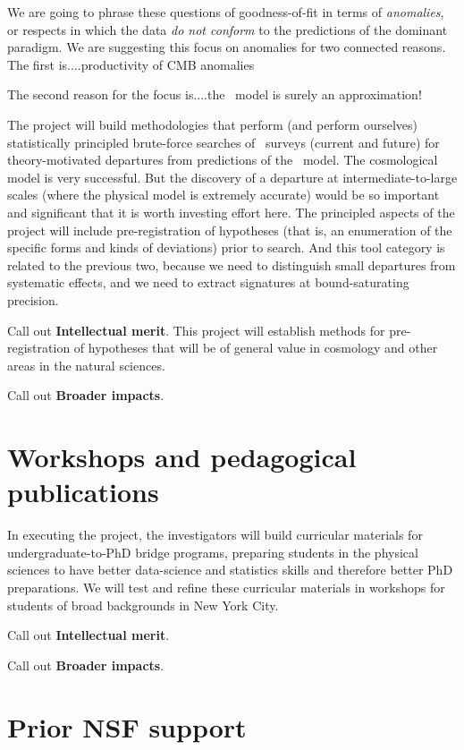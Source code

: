 \documentclass[12pt, fullpage, letterpaper]{article}
\begin{document}
We are going to phrase these questions of goodness-of-fit in terms of
\emph{anomalies}, or respects in which the data \emph{do not conform}
to the predictions of the dominant paradigm.
We are suggesting this focus on anomalies for two connected reasons.
The first is....productivity of CMB anomalies

The second reason for the focus is....the \LCDM\ model is surely an
approximation!

The project will build methodologies that perform (and perform
ourselves) statistically principled brute-force searches of \LSS\ 
surveys (current and future) for theory-motivated departures from
predictions of the \LCDM\ model.
The cosmological model is very successful.
But the discovery of a departure at intermediate-to-large scales
(where the physical model is extremely accurate) would be so important
and significant that it is worth investing effort here.
The principled aspects of the project will include pre-registration of
hypotheses (that is, an enumeration of the specific forms and kinds of
deviations) prior to search.
And this tool category is related to the previous two, because we need
to distinguish small departures from systematic effects, and we need
to extract signatures at bound-saturating precision.

Call out \textbf{Intellectual merit}.
This project will establish methods for pre-registration of hypotheses that
will be of general value in cosmology and other areas in the natural
sciences.

Call out \textbf{Broader impacts}.

\section{Workshops and pedagogical publications}

In executing the project, the investigators will build curricular
materials for undergraduate-to-PhD bridge programs, preparing students
in the physical sciences to have better data-science and statistics
skills and therefore better PhD preparations.
We will test and refine these curricular materials in workshops for
students of broad backgrounds in New York City.

Call out \textbf{Intellectual merit}.

Call out \textbf{Broader impacts}.

\section{Prior NSF support}
\end{document}
